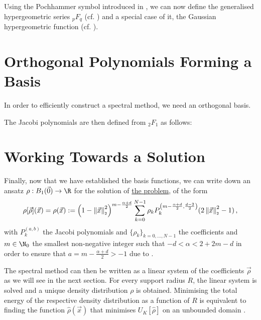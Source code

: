Using the Pochhammer symbol introduced in , we can now define the generalised hypergeometric series ${}_pF_q$ (cf. ) and a special case of it, the Gaussian hypergeometric function (cf. ).



\section{Orthogonal Polynomials Forming a Basis}
In order to efficiently construct a spectral method, we need an orthogonal basis.



The Jacobi polynomials are then defined from ${}_2F_1$ as follows:



\section{Working Towards a Solution}
Finally, now that we have established the basis functions, we can write down an ansatz $\rho: B_1(\vec{0}) \to \R$ for the solution of \hyperref[def:the-problem]{the problem}, of the form
\begin{equation}
  \rho[\vec{\rho}](\vec{x}) = \rho(\vec{x}) := \left(1-\left\lVert\vec{x}\right\rVert_{\scriptscriptstyle 2}^{2}\right)^{m - \frac{\alpha + d}{2}} \sum_{k=0}^{N-1} \rho_k P_{k}^{\left(m - \frac{\alpha + d}{2},\frac{d-2}{2}\right)}(2 \left\lVert\vec{x}\right\rVert_{\scriptscriptstyle 2}^{2}-1)\,,
  \label{eq:ansatz}
\end{equation}
with $P_k^{(a, b)}$ the Jacobi polynomials and $\{\rho_k\}_{k=0, ..., N-1}$ the coefficients and $m \in \N_0$ the smallest non-negative integer such that $-d < \alpha < 2 +  2m - d$ in order to ensure that $a = m - \frac{\alpha+d}{2} > -1$ due to .

The spectral method can then be written as a linear system of the coefficients $\vec{\rho}$ as we will see in the next section.
For every support radius $R$, the linear system is solved and a unique density distribution $\rho$ is obtained.
Minimising the total energy of the respective density distribution as a function of $R$ is equivalent to finding the function $\hat{\rho}(\vec{x})$ that minimises $U_K[\hat{\rho}]$ on an unbounded domain \parencite{2020-power-law-kernels, 2021-arbitrary-dimensions}.

